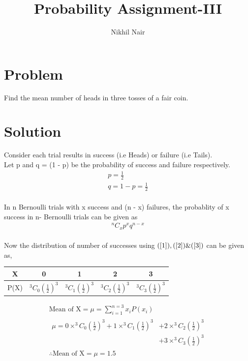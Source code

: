 \documentclass[journal,12pt,twocolumn]{IEEEtran}
\title{\mytitle}
\title{
Probability Assignment-III
}
\author{Nikhil Nair}
\begin{document}
\maketitle
\bigskip


\section{\textbf{Problem }}
Find the mean number of heads in three tosses of a fair coin.


\section{\textbf{Solution }}
Consider each trial results in success (i.e Heads) or failure (i.e Tails).
\\
 
Let p and q = (1 - p) be the probability of success and failure respectively.\\
\begin{align}
p = \frac{1}{2}               \label{1}
\\            
q = 1 - p = \frac{1}{2}       \label{2}
\end{align}\\
In n Bernoulli trials with x success and (n - x) failures, the probablity of x success in n- Bernoulli trials can be given as\\
\begin{align}
^nC_xp^{x} q^{n-x}             \label{3}
\end{align}
\\
Now the distribution of number of successes using $(\ref{1}),(\ref{2}) \& (\ref{3})$ can be given as,
\begin{center}
\begin{tabular}{ |c |c |c |c |c |}
 \hline
 X  &  0 &  1  &  2 & 3\\
 \hline
 P(X)  &  $^3C_0(\frac{1}{2})^{3}$  & $^3C_1(\frac{1}{2})^{3}$  &  $^3C_2(\frac{1}{2})^{3}$ & $^3C_3(\frac{1}{2})^{3}$\\
 \hline
 
\end{tabular}
\end{center}

\begin{align}
\text{Mean of X} = \mu = \sum_{i=1}^{n=3} x_i P(x_i)
\\
\begin{split}
\mu = 0 \times ^3C_0(\frac{1}{2})^{3} + 1 \times ^3C_1(\frac{1}{2})^{3} &+ 2 \times ^3C_2(\frac{1}{2})^{3} \\ &+ 3 \times ^3C_3(\frac{1}{2})^{3}
\end{split}
\\
\therefore \text{Mean of X} = \mu = 1.5
\end{align}
\end{document}
